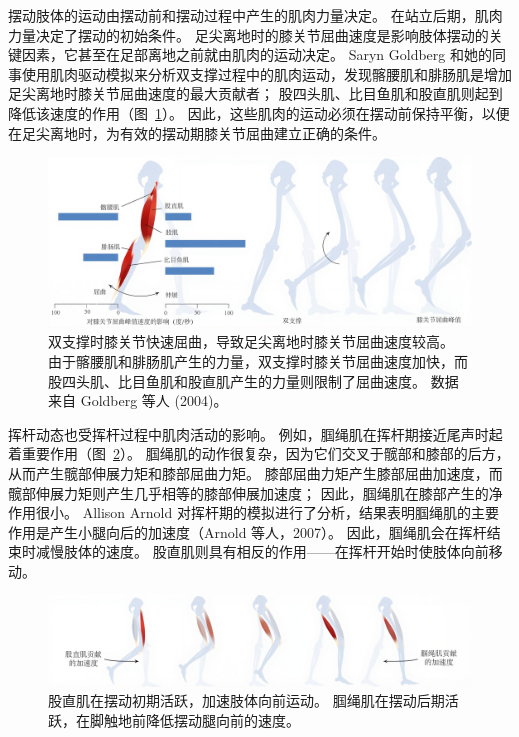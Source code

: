摆动肢体的运动由摆动前和摆动过程中产生的肌肉力量决定。
在站立后期，肌肉力量决定了摆动的初始条件。
足尖离地时的膝关节屈曲速度是影响肢体摆动的关键因素，它甚至在足部离地之前就由肌肉的运动决定。
Saryn Goldberg 和她的同事使用肌肉驱动模拟来分析双支撑过程中的肌肉运动，发现髂腰肌和腓肠肌是增加足尖离地时膝关节屈曲速度的最大贡献者；
股四头肌、比目鱼肌和股直肌则起到降低该速度的作用（图~\ref{fig:11_4}）。
因此，这些肌肉的运动必须在摆动前保持平衡，以便在足尖离地时，为有效的摆动期膝关节屈曲建立正确的条件。


\begin{figure}[!htb]
	\centering
	\includegraphics[width=1.0\linewidth]{chap11/11_4}
	\caption{双支撑时膝关节快速屈曲，导致足尖离地时膝关节屈曲速度较高。
		由于髂腰肌和腓肠肌产生的力量，双支撑时膝关节屈曲速度加快，而股四头肌、比目鱼肌和股直肌产生的力量则限制了屈曲速度。
		数据来自 Goldberg 等人 (2004)。 \label{fig:11_4}}
\end{figure}


挥杆动态也受挥杆过程中肌肉活动的影响。
例如，腘绳肌在挥杆期接近尾声时起着重要作用（图~\ref{fig:11_5}）。
腘绳肌的动作很复杂，因为它们交叉于髋部和膝部的后方，从而产生髋部伸展力矩和膝部屈曲力矩。
膝部屈曲力矩产生膝部屈曲加速度，而髋部伸展力矩则产生几乎相等的膝部伸展加速度；
因此，腘绳肌在膝部产生的净作用很小。
Allison Arnold 对挥杆期的模拟进行了分析，结果表明腘绳肌的主要作用是产生小腿向后的加速度（Arnold 等人，2007）。
因此，腘绳肌会在挥杆结束时减慢肢体的速度。
股直肌则具有相反的作用——在挥杆开始时使肢体向前移动。


\begin{figure}[!htb]
	\centering
	\includegraphics[width=1.0\linewidth]{chap11/11_5}
	\caption{股直肌在摆动初期活跃，加速肢体向前运动。
		腘绳肌在摆动后期活跃，在脚触地前降低摆动腿向前的速度。 \label{fig:11_5}}
\end{figure}


